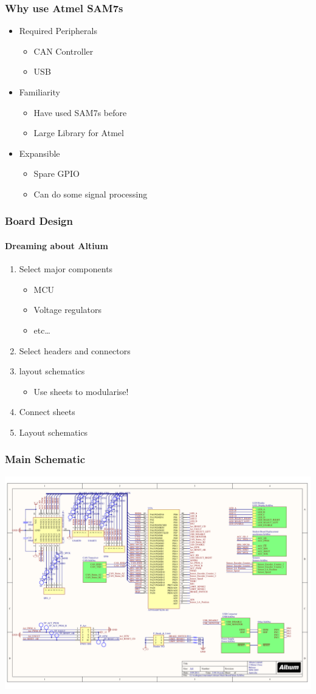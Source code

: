 \documentclass{beamer}
\begin{document}
\begin{frame}
\frametitle{Why use Atmel SAM7s}
\begin{itemize}
\item Required Peripherals 
  \begin{itemize}
  \item CAN Controller
  \item USB
  \end{itemize}
\item Familiarity
  \begin{itemize}
  \item Have used SAM7s before
  \item Large Library for Atmel
  \end{itemize}
\item Expansible
  \begin{itemize}
  \item Spare GPIO
  \item Can do some signal processing
  \end{itemize}
\end{itemize}
\end{frame}

\begin{frame}
\frametitle{Board Design}
\framesubtitle{Dreaming about Altium}
\begin{enumerate}
\item Select major components
  \begin{itemize}
  \item MCU
  \item Voltage regulators
  \item etc\ldots
  \end{itemize}
\item Select headers and connectors
\item layout schematics
  \begin{itemize}
  \item Use sheets to modularise!
  \end{itemize}
\item Connect sheets
\item Layout schematics
\end{enumerate}
\end{frame}

\begin{frame}
\frametitle{Main Schematic}
    \begin{center}
      \includegraphics[width=1.0\textwidth]{Images/Schematic}
    \end{center}
\end{frame}
\end{document}
